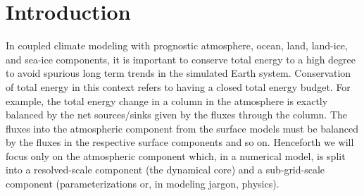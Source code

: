 \documentclass{agujournal}
\begin{document}
%
%

% 


%
% 
% 
% 


\section{Introduction}
In coupled climate modeling with prognostic atmosphere, ocean, land, land-ice, and sea-ice components, it is important to conserve total energy to a high degree to avoid spurious long term trends in the simulated Earth system. Conservation of total energy in this context refers to having a closed total energy budget. For example, the total energy change in a column in the atmosphere is exactly balanced by the net sources/sinks given by the fluxes through the column. The fluxes into the atmospheric component from the surface models must be balanced by the fluxes in the respective surface components and so on. Henceforth we will focus only on the atmospheric component which, in a numerical model, is split into a resolved-scale component (the dynamical core) and a sub-grid-scale component (parameterizations or, in modeling jargon, physics). 
\end{document}
